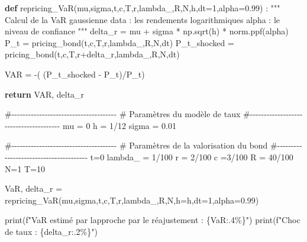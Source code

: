 \documentclass[
  letterpaper,
  DIV=11,
  numbers=noendperiod]{scrartcl}
\newenvironment{Shaded}{\begin{snugshade}}{\end{snugshade}}
\newcommand{\BuiltInTok}[1]{\textcolor[rgb]{0.00,0.23,0.31}{#1}}
\newcommand{\CommentTok}[1]{\textcolor[rgb]{0.37,0.37,0.37}{#1}}
\newcommand{\ControlFlowTok}[1]{\textcolor[rgb]{0.00,0.23,0.31}{\textbf{#1}}}
\newcommand{\DecValTok}[1]{\textcolor[rgb]{0.68,0.00,0.00}{#1}}
\newcommand{\FloatTok}[1]{\textcolor[rgb]{0.68,0.00,0.00}{#1}}
\newcommand{\KeywordTok}[1]{\textcolor[rgb]{0.00,0.23,0.31}{\textbf{#1}}}
\newcommand{\NormalTok}[1]{\textcolor[rgb]{0.00,0.23,0.31}{#1}}
\newcommand{\OperatorTok}[1]{\textcolor[rgb]{0.37,0.37,0.37}{#1}}
\newcommand{\SpecialCharTok}[1]{\textcolor[rgb]{0.37,0.37,0.37}{#1}}
\newcommand{\SpecialStringTok}[1]{\textcolor[rgb]{0.13,0.47,0.30}{#1}}
\begin{document}
\begin{Shaded}
\begin{Highlighting}[]
\KeywordTok{def}\NormalTok{ repricing\_VaR(mu,sigma,t,c,T,r,lambda\_,R,N,h,dt}\OperatorTok{=}\DecValTok{1}\NormalTok{,alpha}\OperatorTok{=}\FloatTok{0.99}\NormalTok{) :}
    \CommentTok{"""}
\CommentTok{    Calcul de la VaR gaussienne}
\CommentTok{    data : les rendements logarithmiques}
\CommentTok{    alpha : le niveau de confiance}
\CommentTok{    """}
\NormalTok{    delta\_r }\OperatorTok{=}\NormalTok{ mu }\OperatorTok{+}\NormalTok{ sigma }\OperatorTok{*}\NormalTok{ np.sqrt(h) }\OperatorTok{*}\NormalTok{ norm.ppf(alpha)}
\NormalTok{    P\_t }\OperatorTok{=}\NormalTok{ pricing\_bond(t,c,T,r,lambda\_,R,N,dt)}
\NormalTok{    P\_t\_shocked }\OperatorTok{=}\NormalTok{ pricing\_bond(t,c,T,r}\OperatorTok{+}\NormalTok{delta\_r,lambda\_,R,N,dt)}

\NormalTok{    VAR }\OperatorTok{=} \OperatorTok{{-}}\NormalTok{( (P\_t\_shocked }\OperatorTok{{-}}\NormalTok{ P\_t)}\OperatorTok{/}\NormalTok{P\_t)}

    \ControlFlowTok{return}\NormalTok{ VAR, delta\_r}


\CommentTok{\#{-}{-}{-}{-}{-}{-}{-}{-}{-}{-}{-}{-}{-}{-}{-}{-}{-}{-}{-}{-}{-}{-}{-}{-}{-}{-}{-}{-}{-}{-}{-}{-}{-}{-}{-}{-}{-}{-}}
\CommentTok{\# Paramètres du modèle de taux}
\CommentTok{\#{-}{-}{-}{-}{-}{-}{-}{-}{-}{-}{-}{-}{-}{-}{-}{-}{-}{-}{-}{-}{-}{-}{-}{-}{-}{-}{-}{-}{-}{-}{-}{-}{-}{-}{-}{-}{-}{-}{-}}
\NormalTok{mu }\OperatorTok{=} \DecValTok{0}
\NormalTok{h }\OperatorTok{=} \DecValTok{1}\OperatorTok{/}\DecValTok{12}
\NormalTok{sigma }\OperatorTok{=} \FloatTok{0.01}

\CommentTok{\#{-}{-}{-}{-}{-}{-}{-}{-}{-}{-}{-}{-}{-}{-}{-}{-}{-}{-}{-}{-}{-}{-}{-}{-}{-}{-}{-}{-}{-}{-}{-}{-}{-}{-}{-}{-}{-}{-}}
\CommentTok{\# Paramètres de la valorisation du bond}
\CommentTok{\#{-}{-}{-}{-}{-}{-}{-}{-}{-}{-}{-}{-}{-}{-}{-}{-}{-}{-}{-}{-}{-}{-}{-}{-}{-}{-}{-}{-}{-}{-}{-}{-}{-}{-}{-}{-}{-}{-}{-}}
\NormalTok{t}\OperatorTok{=}\DecValTok{0}
\NormalTok{lambda\_ }\OperatorTok{=} \DecValTok{1}\OperatorTok{/}\DecValTok{100}
\NormalTok{r }\OperatorTok{=} \DecValTok{2}\OperatorTok{/}\DecValTok{100}
\NormalTok{c }\OperatorTok{=}\DecValTok{3}\OperatorTok{/}\DecValTok{100}
\NormalTok{R }\OperatorTok{=} \DecValTok{40}\OperatorTok{/}\DecValTok{100}
\NormalTok{N}\OperatorTok{=}\DecValTok{1}
\NormalTok{T}\OperatorTok{=}\DecValTok{10}

\NormalTok{VaR, delta\_r }\OperatorTok{=}\NormalTok{ repricing\_VaR(mu,sigma,t,c,T,r,lambda\_,R,N,h}\OperatorTok{=}\NormalTok{h,dt}\OperatorTok{=}\DecValTok{1}\NormalTok{,alpha}\OperatorTok{=}\FloatTok{0.99}\NormalTok{)}

\BuiltInTok{print}\NormalTok{(}\SpecialStringTok{f"VaR estimé par l\textquotesingle{}approche par le réajustement : }\SpecialCharTok{\{}\NormalTok{VaR}\SpecialCharTok{:.4\%\}}\SpecialStringTok{"}\NormalTok{)}
\BuiltInTok{print}\NormalTok{(}\SpecialStringTok{f"Choc de taux : }\SpecialCharTok{\{}\NormalTok{delta\_r}\SpecialCharTok{:.2\%\}}\SpecialStringTok{"}\NormalTok{)}
\end{Highlighting}
\end{Shaded}
\end{document}
